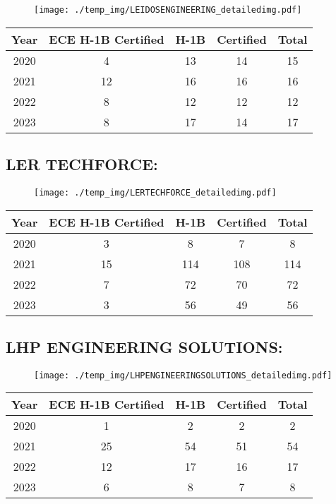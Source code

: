 \documentclass{article}%
\begin{document}
\begin{figure}[htbp]%
\centering%
\texttt{[image: ./temp\_img/LEIDOSENGINEERING\_detailedimg.pdf]}%
\end{figure}

%
\begin{longtable}{c|c|c|c|c}%
\hline%
Year&ECE H{-}1B Certified&H{-}1B&Certified&Total\\%
\hline%
2020&4&13&14&15\\%
\hline%
2021&12&16&16&16\\%
\hline%
2022&8&12&12&12\\%
\hline%
2023&8&17&14&17\\%
\hline%
\end{longtable}

%
\newpage%
\subsection{LER TECHFORCE:}%
\label{subsec:LERTECHFORCE}%
\label{LERTECHFORCEdetailed}%


\begin{figure}[htbp]%
\centering%
\texttt{[image: ./temp\_img/LERTECHFORCE\_detailedimg.pdf]}%
\end{figure}

%
\begin{longtable}{c|c|c|c|c}%
\hline%
Year&ECE H{-}1B Certified&H{-}1B&Certified&Total\\%
\hline%
2020&3&8&7&8\\%
\hline%
2021&15&114&108&114\\%
\hline%
2022&7&72&70&72\\%
\hline%
2023&3&56&49&56\\%
\hline%
\end{longtable}

%
\newpage%
\subsection{LHP ENGINEERING SOLUTIONS:}%
\label{subsec:LHPENGINEERINGSOLUTIONS}%
\label{LHPENGINEERINGSOLUTIONSdetailed}%


\begin{figure}[htbp]%
\centering%
\texttt{[image: ./temp\_img/LHPENGINEERINGSOLUTIONS\_detailedimg.pdf]}%
\end{figure}

%
\begin{longtable}{c|c|c|c|c}%
\hline%
Year&ECE H{-}1B Certified&H{-}1B&Certified&Total\\%
\hline%
2020&1&2&2&2\\%
\hline%
2021&25&54&51&54\\%
\hline%
2022&12&17&16&17\\%
\hline%
2023&6&8&7&8\\%
\hline%
\end{longtable}
\end{document}
